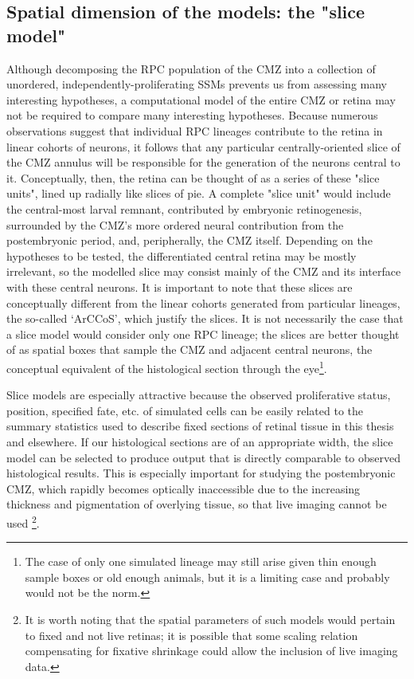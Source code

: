 \subsection{Spatial dimension of the models: the "slice model"}
\label{ssec:slice}
Although decomposing the RPC population of the CMZ into a collection of unordered, independently-proliferating SSMs prevents us from assessing many interesting hypotheses, a computational model of the entire CMZ or retina may not be required to compare many interesting hypotheses. Because numerous observations suggest that individual RPC lineages contribute to the retina in linear cohorts of neurons, it follows that any particular centrally-oriented slice of the CMZ annulus will be responsible for the generation of the neurons central to it. Conceptually, then, the retina can be thought of as a series of these "slice units", lined up radially like slices of pie. A complete "slice unit" would include the central-most larval remnant, contributed by embryonic retinogenesis, surrounded by the CMZ's more ordered neural contribution from the postembryonic period, and, peripherally, the CMZ itself. Depending on the hypotheses to be tested, the differentiated central retina may be mostly irrelevant, so the modelled slice may consist mainly of the CMZ and its interface with these central neurons. It is important to note that these slices are conceptually different from the linear cohorts generated from particular lineages, the so-called `ArCCoS', which justify the slices. It is not necessarily the case that a slice model would consider only one RPC lineage; the slices are better thought of as spatial boxes that sample the CMZ and adjacent central neurons, the conceptual equivalent of the histological section through the eye\footnote{The case of only one simulated lineage may still arise given thin enough sample boxes or old enough animals, but it is a limiting case and probably would not be the norm.}.

Slice models are especially attractive because the observed proliferative status, position, specified fate, etc. of simulated cells can be easily related to the summary statistics used to describe fixed sections of retinal tissue in this thesis and elsewhere. If our histological sections are of an appropriate width, the slice model can be selected to produce output that is directly comparable to observed histological results. This is especially important for studying the postembryonic CMZ, which rapidly becomes optically inaccessible due to the increasing thickness and pigmentation of overlying tissue, so that live imaging cannot be used \footnote{It is worth noting that the spatial parameters of such models would pertain to fixed and not live retinas; it is possible that some scaling relation compensating for fixative shrinkage could allow the inclusion of live imaging data.}.

